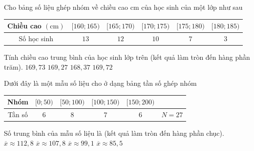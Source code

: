 \begin{ex}%
	Cho bảng số liệu ghép nhóm về chiều cao  cm của học sinh của một lớp như sau
	\begin{center}
		\begin{tabular}{|c|c|c|c|c|c|}
			\hline Chiều cao $(\mathrm{cm})$ & {$[160; 165)$} & {$[165; 170)$} & {$[170; 175)$} & {$[175; 180)$} & {$[180; 185)$}  \\
			\hline Số học sinh & $13$ & $12$ & $10$ & $7$ & $3$ \\ 
			\hline 
		\end{tabular}
	\end{center}
	Tính chiều cao  trung bình của học sinh lớp trên (kết quả làm tròn đến hàng phần trăm).
	\choice 
		{$169{,}73$} 
		 {$169{,}27$}
		{$168{,}37$} 
		 {\True $169{,}72$}
\end{ex}

\begin{ex}%
	Dưới đây là một mẫu số liệu cho ở dạng bảng tần số ghép  nhóm
	\begin{center}
		\begin{tabular}{|c|c|c|c|c|c|}
			 \hline
			Nhóm &  $[0;50)$ & $[50;100)$ & $[100;150)$ & $[150;200)$ & \\
			 \hline
			 Tần số & $6$ & $8$ & $7$ & $6$ & $N=27$ \\
			\hline 
		\end{tabular}
	\end{center}
	Số trung bình của mẫu  số liệu là (kết quả làm tròn đến hàng phần chục).
	 \choice
		{$\overline{x}\approx 112{,}8$} 
		{$\overline{x}\approx  107{,}8$}
		{\True $\overline{x}\approx 99{,}1$} 
		 {$\overline{x}\approx 85{,}5$}
\end{ex}


